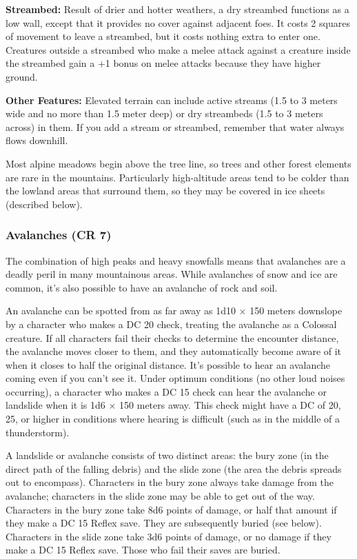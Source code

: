 \textbf{Streambed:} Result of drier and hotter weathers, a dry streambed functions as a low wall, except that it provides no cover against adjacent foes. It costs 2 squares of movement to leave a streambed, but it costs nothing extra to enter one. Creatures outside a streambed who make a melee attack against a creature inside the streambed gain a +1 bonus on melee attacks because they have higher ground.

\textbf{Other Features:} Elevated terrain can include active streams (1.5 to 3 meters wide and no more than 1.5 meter deep) or dry streambeds (1.5 to 3 meters across) in them. If you add a stream or streambed, remember that water always flows downhill.

Most alpine meadows begin above the tree line, so trees and other forest elements are rare in the mountains. Particularly high-altitude areas tend to be colder than the lowland areas that surround them, so they may be covered in ice sheets (described below).

\subsubsection{Avalanches (CR 7)}
The combination of high peaks and heavy snowfalls means that avalanches are a deadly peril in many mountainous areas. While avalanches of snow and ice are common, it's also possible to have an avalanche of rock and soil.

An avalanche can be spotted from as far away as 1d10 $\times$ 150 meters downslope by a character who makes a DC 20  check, treating the avalanche as a Colossal creature. If all characters fail their  checks to determine the encounter distance, the avalanche moves closer to them, and they automatically become aware of it when it closes to half the original distance. It's possible to hear an avalanche coming even if you can't see it. Under optimum conditions (no other loud noises occurring), a character who makes a DC 15  check can hear the avalanche or landslide when it is 1d6 $\times$ 150 meters away. This check might have a DC of 20, 25, or higher in conditions where hearing is difficult (such as in the middle of a thunderstorm).

A landslide or avalanche consists of two distinct areas: the bury zone (in the direct path of the falling debris) and the slide zone (the area the debris spreads out to encompass). Characters in the bury zone always take damage from the avalanche; characters in the slide zone may be able to get out of the way. Characters in the bury zone take 8d6 points of damage, or half that amount if they make a DC 15 Reflex save. They are subsequently buried (see below). Characters in the slide zone take 3d6 points of damage, or no damage if they make a DC 15 Reflex save. Those who fail their saves are buried.

